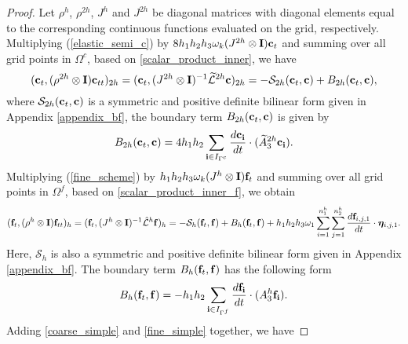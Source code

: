 \begin{proof}
		Let $\rho^{h}$, $\rho^{2h}$, $J^{h}$ and $J^{2h}$ be diagonal matrices with diagonal elements equal to the corresponding continuous functions evaluated on the grid, respectively. 
	Multiplying (\ref{elastic_semi_c}) by $8h_1h_2h_3\omega_k(J^{2h}\otimes {\bf I}){\bf c}_t$ and summing over all grid points in $\Omega^c$, based on \eqref{scalar_product_inner}, we have
	\begin{equation}\label{coarse_simple}
	({\bf c}_t, (\rho^{2h}\otimes {\bf I}){\bf c}_{tt})_{2h} = ({\bf c}_t,(J^{2h}\otimes {\bf I})^{-1}\wt{\mathcal{L}}^{2h}{\bf c})_{2h} = -\mathcal{S}_{2h}({\bf c}_t,{\bf c}) + B_{2h}({\bf c}_t,{{\bf c}}),
	\end{equation}
	where $\mathcal{S}_{2h}({\bf c}_t,{\bf c})$ is a symmetric and positive definite bilinear form given in Appendix \ref{appendix_bf}, the boundary term $B_{2h} ({\bf c}_t,{\bf c})$ is given by
	\begin{equation}\label{bounary_c1}
	B_{2h} ({\bf c}_t,{\bf c}) = 4h_1h_2\sum_{{\bf i}\in I_{\Gamma^c}}\frac{d{\bf c}_{\bf i}}{dt}\cdot (\wt{A}_3^{2h}{\bf c}_{\bf i}).
	\end{equation}
	Multiplying (\ref{fine_scheme}) by $h_1h_2h_3\omega_k(J^h\otimes {\bf I}){\bf f}_t$ and summing over all grid points in $\Omega^f$, based on \eqref{scalar_product_inner_f}, we obtain
	\begin{equation}\label{fine_simple}
	({\bf f}_t, (\rho^h\otimes {\bf I}){\bf f}_{tt})_h = ({\bf f}_t,(J^h\otimes {\bf I})^{-1}\hat{\mathcal{L}}^h{\bf f})_h = -\mathcal{S}_{h}({\bf f}_t,{\bf f}) + B_h({\bf f}_t,{\bf f}) 
	+h_1h_2h_3\omega_1\sum_{i = 1}^{n_1^h}\sum_{j=1}^{n_2^h} \frac{d{\bf f}_{i,j,1}}{dt}\cdot{\bm \eta}_{i,j,1}.
	\end{equation}
Here, $\mathcal{S}_h$ is also a symmetric and positive definite bilinear form given in Appendix \ref{appendix_bf}. The boundary term $B_h ({\bf f}_t,{\bf f})$ has the following form
	\begin{equation}\label{boundary_f1}
	B_h ({\bf f}_t,{\bf f}) = -h_1h_2\sum_{{\bf i}\in I_{\Gamma^f}}\frac{d{\bf f}_{\bf i}}{dt}\cdot(A_3^h {\bf f}_{\bf i}).
	\end{equation}
	 Adding \eqref{coarse_simple} and \eqref{fine_simple} together, we have

\end{proof}
